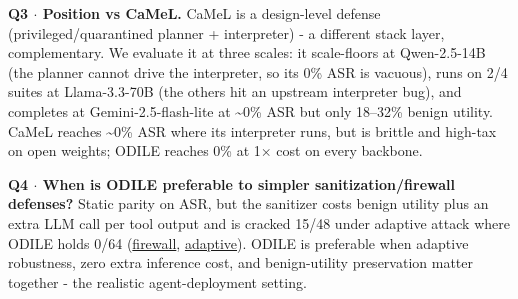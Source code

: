 \documentclass[11pt]{article}
\begin{document}
\textbf{Q3 $\cdot$ Position vs CaMeL.} CaMeL is a design-level defense (privileged/quarantined planner + interpreter) - a different stack layer, complementary. We evaluate it at three scales: it scale-floors at Qwen-2.5-14B (the planner cannot drive the interpreter, so its 0\% ASR is vacuous), runs on 2/4 suites at Llama-3.3-70B (the others hit an upstream interpreter bug), and completes at Gemini-2.5-flash-lite at \textasciitilde{}0\% ASR but only 18--32\% benign utility. CaMeL reaches \textasciitilde{}0\% ASR where its interpreter runs, but is brittle and high-tax on open weights; ODILE reaches 0\% at 1$\times$ cost on every backbone.\par

\textbf{Q4 $\cdot$ When is ODILE preferable to simpler sanitization/firewall defenses?} Static parity on ASR, but the sanitizer costs benign utility plus an extra LLM call per tool output and is cracked 15/48 under adaptive attack where ODILE holds 0/64 (\href{https://github.com/memo-ozdincer/odile-rebuttal-exhibits/blob/main/T\_firewall.pdf}{\textcolor{linkblue}{firewall}}, \href{https://github.com/memo-ozdincer/odile-rebuttal-exhibits/blob/main/tab\_adaptive\_tap\_pair.pdf}{\textcolor{linkblue}{adaptive}}). ODILE is preferable when adaptive robustness, zero extra inference cost, and benign-utility preservation matter together - the realistic agent-deployment setting.\par
\end{document}
